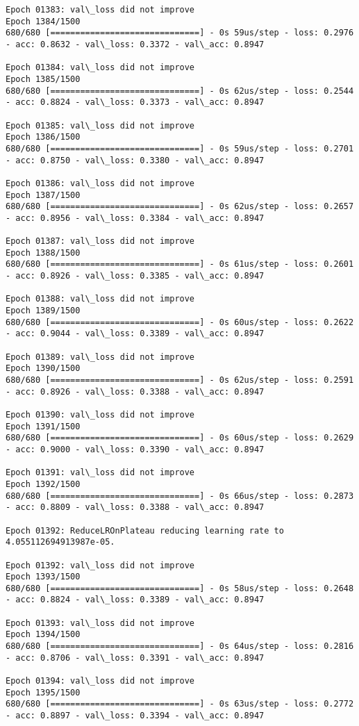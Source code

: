 \documentclass[11pt]{article}
\begin{document}
\begin{Verbatim}[commandchars=\\\{\}]
Epoch 01383: val\_loss did not improve
Epoch 1384/1500
680/680 [==============================] - 0s 59us/step - loss: 0.2976 - acc: 0.8632 - val\_loss: 0.3372 - val\_acc: 0.8947

Epoch 01384: val\_loss did not improve
Epoch 1385/1500
680/680 [==============================] - 0s 62us/step - loss: 0.2544 - acc: 0.8824 - val\_loss: 0.3373 - val\_acc: 0.8947

Epoch 01385: val\_loss did not improve
Epoch 1386/1500
680/680 [==============================] - 0s 59us/step - loss: 0.2701 - acc: 0.8750 - val\_loss: 0.3380 - val\_acc: 0.8947

Epoch 01386: val\_loss did not improve
Epoch 1387/1500
680/680 [==============================] - 0s 62us/step - loss: 0.2657 - acc: 0.8956 - val\_loss: 0.3384 - val\_acc: 0.8947

Epoch 01387: val\_loss did not improve
Epoch 1388/1500
680/680 [==============================] - 0s 61us/step - loss: 0.2601 - acc: 0.8926 - val\_loss: 0.3385 - val\_acc: 0.8947

Epoch 01388: val\_loss did not improve
Epoch 1389/1500
680/680 [==============================] - 0s 60us/step - loss: 0.2622 - acc: 0.9044 - val\_loss: 0.3389 - val\_acc: 0.8947

Epoch 01389: val\_loss did not improve
Epoch 1390/1500
680/680 [==============================] - 0s 62us/step - loss: 0.2591 - acc: 0.8926 - val\_loss: 0.3388 - val\_acc: 0.8947

Epoch 01390: val\_loss did not improve
Epoch 1391/1500
680/680 [==============================] - 0s 60us/step - loss: 0.2629 - acc: 0.9000 - val\_loss: 0.3390 - val\_acc: 0.8947

Epoch 01391: val\_loss did not improve
Epoch 1392/1500
680/680 [==============================] - 0s 66us/step - loss: 0.2873 - acc: 0.8809 - val\_loss: 0.3388 - val\_acc: 0.8947

Epoch 01392: ReduceLROnPlateau reducing learning rate to 4.055112694913987e-05.

Epoch 01392: val\_loss did not improve
Epoch 1393/1500
680/680 [==============================] - 0s 58us/step - loss: 0.2648 - acc: 0.8824 - val\_loss: 0.3389 - val\_acc: 0.8947

Epoch 01393: val\_loss did not improve
Epoch 1394/1500
680/680 [==============================] - 0s 64us/step - loss: 0.2816 - acc: 0.8706 - val\_loss: 0.3391 - val\_acc: 0.8947

Epoch 01394: val\_loss did not improve
Epoch 1395/1500
680/680 [==============================] - 0s 63us/step - loss: 0.2772 - acc: 0.8897 - val\_loss: 0.3394 - val\_acc: 0.8947


\end{Verbatim}
\end{document}
